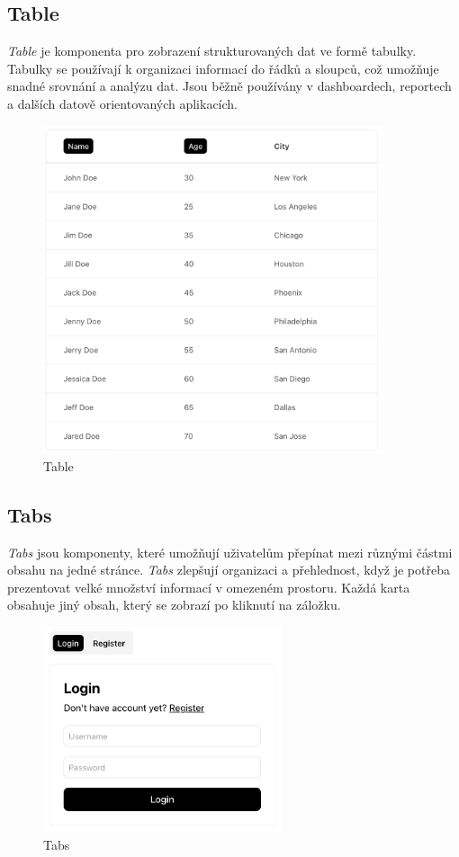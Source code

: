 \subsection{Table}
\emph{Table} je komponenta pro zobrazení strukturovaných dat ve formě tabulky. Tabulky se používají k organizaci informací do řádků a sloupců, což umožňuje snadné srovnání a analýzu dat. Jsou běžně používány v dashboardech, reportech a dalších datově orientovaných aplikacích.

\begin{figure}[H]
  \centering
  \includegraphics[width=10cm]{images/table}
  \captionsetup{justification=centering,margin=2cm}
  \caption{Table} \label{picture:table}
\end{figure}

\clearpage

\subsection{Tabs}
\emph{Tabs} jsou komponenty, které umožňují uživatelům přepínat mezi různými částmi obsahu na jedné stránce. \emph{Tabs} zlepšují organizaci a přehlednost, když je potřeba prezentovat velké množství informací v omezeném prostoru. Každá karta obsahuje jiný obsah, který se zobrazí po kliknutí na záložku.

\begin{figure}[H]
  \centering
  \includegraphics[width=7cm]{images/tabs}
  \captionsetup{justification=centering,margin=2cm}
  \caption{Tabs} \label{picture:tabs}
\end{figure}

